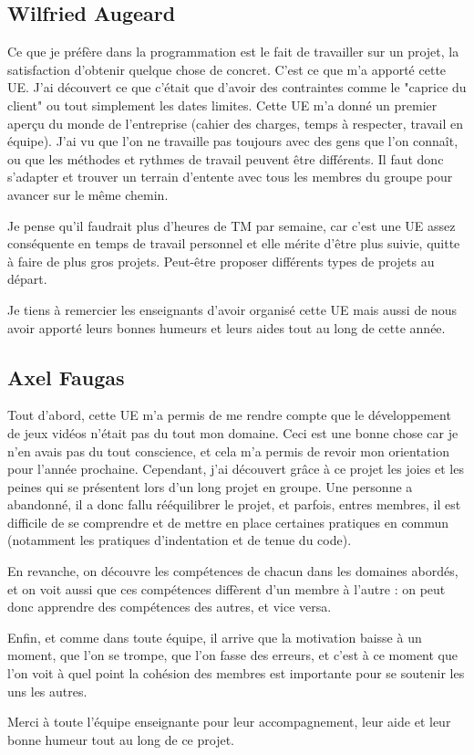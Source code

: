 \documentclass[12pt]{article}
\begin{document}
\subsection{Wilfried Augeard}
Ce que je préfère dans la programmation est le fait de travailler sur un projet, la satisfaction d'obtenir quelque chose de concret. C'est ce que m'a apporté cette UE. J'ai découvert ce que c'était que d'avoir des contraintes comme le "caprice du client" ou tout simplement les dates limites. Cette UE m'a donné un premier aper\c{c}u du monde de l'entreprise (cahier des charges, temps à respecter, travail en équipe). J'ai vu que l'on ne travaille pas toujours avec des gens que l'on connaît, ou que les méthodes et rythmes de travail peuvent être différents. Il faut donc s'adapter et trouver un terrain d'entente avec tous les membres du groupe pour avancer sur le même chemin.

Je pense qu'il faudrait plus d'heures de TM par semaine, car c'est une UE assez conséquente en temps de travail personnel et elle mérite d'être plus suivie, quitte à faire de plus gros projets. Peut-être proposer différents types de projets au départ. 

\vspace{10mm}
Je tiens à remercier les enseignants d'avoir organisé cette UE mais aussi de nous avoir apporté leurs bonnes humeurs et leurs aides tout au long de cette année.  
\smiley

\subsection{Axel Faugas}
Tout d'abord, cette UE m'a permis de me rendre compte que le développement de jeux vidéos n'était pas du tout mon domaine. Ceci est une bonne chose car je n'en avais pas du tout conscience, et cela m'a permis de revoir mon orientation pour l'année prochaine. Cependant, j'ai découvert grâce à ce projet les joies et les peines qui se présentent lors d'un long projet en groupe. Une personne a abandonné, il a donc fallu rééquilibrer le projet, et parfois, entres membres, il est difficile de se comprendre et de mettre en place certaines pratiques en commun (notamment les pratiques d'indentation et de tenue du code).

En revanche, on découvre les compétences de chacun dans les domaines abordés, et on voit aussi que ces compétences diffèrent d'un membre à l'autre : on peut donc apprendre des compétences des autres, et vice versa.

Enfin, et comme dans toute équipe, il arrive que la motivation baisse à un moment, que l'on se trompe, que l'on fasse des erreurs, et c'est à ce moment que l'on voit à quel point la cohésion des membres est importante pour se soutenir les uns les autres.

\vspace{10mm}
\centering
Merci à toute l'équipe enseignante pour leur accompagnement, leur aide et leur bonne humeur tout au long de ce projet.
\end{document}
